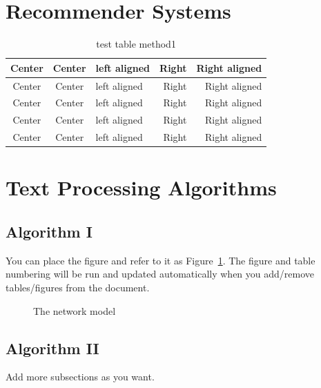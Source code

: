 \documentclass[12pt,oneside,openright,a4paper]{cpe-english-project}
\begin{document}
\section{Recommender Systems}

\begin{table}[!h]
\caption{test table method1}\label{tbl:method1}
\begin{tabular}{c|c|l|rr} \hline\hline
Center & Center & left aligned & Right & Right aligned \\ \hline\hline
Center & Center & left aligned & Right & Right aligned \\ \hline
Center & Center & left aligned & Right & Right aligned \\ 
Center & Center & left aligned & Right & Right aligned \\ \hline
Center & Center & left aligned & Right & Right aligned \\ \hline\hline
\end{tabular}
\end{table}


\section{Text Processing Algorithms}
\subsection{Algorithm I}

You can place the figure and refer to it as Figure~\ref{fig:model2}.
The figure and table numbering will be run and updated automatically when you add/remove tables/figures from the document.

\begin{figure}[!h]\centering
\setlength{\fboxrule}{0.2mm} %
\setlength{\fboxsep}{1cm}
\caption{The network model}\label{fig:model2}
\end{figure}

 
\subsection{Algorithm II}
Add more subsections as you want.
\end{document}
